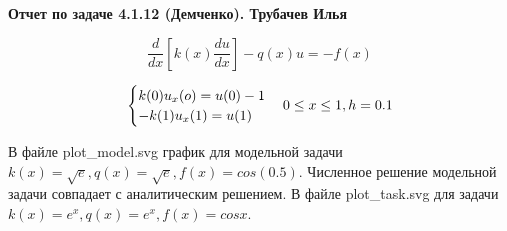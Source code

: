 \documentclass[a4paper, 12pt]{article}
\begin{document}
	\begin{center}
		\textbf{Отчет по задаче 4.1.12 (Демченко). Трубачев Илья}
	\end{center}

	\begin{equation*}
		\frac{d}{dx} [k(x) \frac{du}{dx}] - q(x)u = -f(x)
	\end{equation*}
	
	\begin{equation*}
	\begin{cases}
	k(0) u_x(o) = u(0) - 1 \\
	-k(1) u_x(1) = u(1)
	\end{cases} \\
	0 \leq x \leq 1, h = 0.1
	\end{equation*}
	
	
	В файле plot\_model.svg график для модельной задачи $k(x) = \sqrt{e}, q(x) = \sqrt{e}, f(x) = cos(0.5)$. Численное решение модельной задачи совпадает с аналитическим решением. В файле plot\_task.svg для задачи $k(x) = e^x, q(x) = e^x, f(x) = cosx$.
\end{document}
